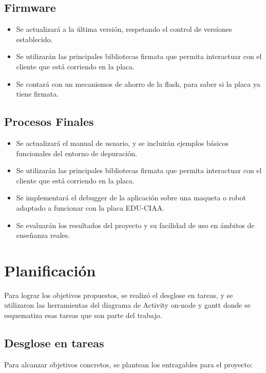 \subsection{Firmware}

\begin{itemize}
	\item Se actualizará a la última versión, respetando el control de versiones establecido.	
	\item Se utilizarán las principales bibliotecas firmata que permita interactuar con el cliente que está corriendo en la placa.
	\item Se contará con un mecanismos de ahorro de la flash, para saber si la placa ya tiene firmata.
\end{itemize}

\subsection{Procesos Finales}

\begin{itemize}
	\item Se actualizará el manual de usuario, y se incluirán ejemplos básicos funcionales del entorno de depuración.	
	\item Se utilizarán las principales bibliotecas firmata que permita interactuar con el cliente que está corriendo en la placa.
	\item Se implementará el debugger de la aplicación sobre una maqueta o robot adaptado a funcionar con la placa EDU-CIAA.
	\item Se evaluarán los resultados del proyecto y su facilidad de uso en ámbitos de enseñanza reales.
\end{itemize}

\section{Planificación}
\label{sec:ejemplo}

Para lograr los objetivos propuestos, se realizó el desglose en tareas, y se utilizaron las herramientas del diagrama de Activity on-node y gantt donde se esquematiza esas tareas que son parte del trabajo.

\subsection{Desglose en tareas} 

Para alcanzar objetivos concretos, se plantean los entragables para el proyecto:

